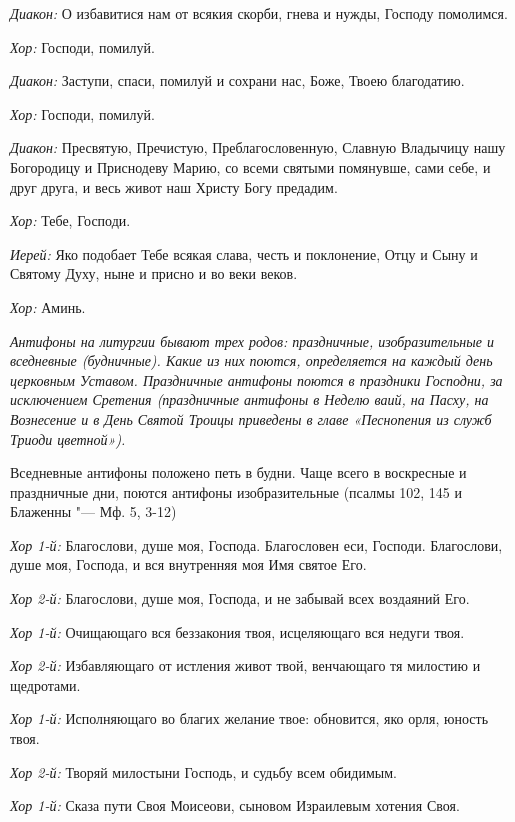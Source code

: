 \begin{mymulticols}
{\itshape Диакон:} О избавитися нам от всякия скорби, гнева и нужды, Господу помолимся. 

{\itshape Хор:} Господи, помилуй.

{\itshape Диакон:} Заступи, спаси, помилуй и сохрани нас, Боже, Твоею благодатию. 

{\itshape Хор:} Господи, помилуй.

{\itshape Диакон:} Пресвятую, Пречистую, Преблагословенную, Славную Владычицу нашу Богородицу и Приснодеву Марию, со всеми святыми помянувше, сами себе, и друг друга, и весь живот наш Христу Богу предадим. 


{\itshape Хор:} Тебе, Господи. 


{\itshape Иерей:} Яко подобает Тебе всякая слава, честь и поклонение, Отцу и Сыну и Святому Духу, ныне и присно и во веки веков. 


{\itshape Хор:} Аминь.




{\itshape Антифоны на литургии бывают трех родов: праздничные, изобразительные и вседневные (будничные). Какие из них поются, определяется на каждый день церковным Уставом. Праздничные антифоны поются в праздники Господни, за исключением Сретения (праздничные антифоны в Неделю ваий, на Пасху, на Вознесение и в День Святой Троицы приведены в главе «Песнопения из служб Триоди цветной»).


Вседневные антифоны положено петь в будни. Чаще всего в воскресные и праздничные дни, поются антифоны изобразительные (псалмы 102, 145 и Блаженны "--- Мф. 5, 3-12)}




{\itshape Хор 1-й:} Благослови, душе моя, Господа. Благословен еси, Господи. Благослови, душе моя, Господа, и вся внутренняя моя Имя святое Его. 


{\itshape Хор 2-й:} Благослови, душе моя, Господа, и не забывай всех воздаяний Его. 


{\itshape Хор 1-й:} Очищающаго вся беззакония твоя,  исцеляющаго вся недуги твоя. 


{\itshape Хор 2-й:} Избавляющаго от истления живот твой,  венчающаго тя милостию и щедротами. 


{\itshape Хор 1-й:} Исполняющаго во благих желание твое:  обновится, яко орля, юность твоя. 


{\itshape Хор 2-й:} Творяй милостыни Господь, и судьбу всем обидимым. 


{\itshape Хор 1-й:} Сказа пути Своя Моисеови, сыновом Израилевым хотения Своя. 



\end{mymulticols}
